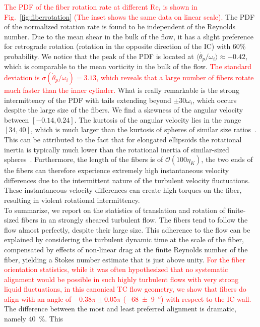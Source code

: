 \documentclass[aps, pre, onecolumn, superscriptaddress,longbibliography]{revtex4-1}
\newcommand{\makered}[1]{\textcolor{red}{#1}}
\begin{document}
%
\makered{The PDF of the fiber rotation rate at different $\text{Re}_i$ is shown in
Fig.~\ref{fig:fiberrotation} (The inset shows the same data on linear scale).}
The PDF of the normalized rotation rate is found
to be independent of the Reynolds number.
Due to the mean shear in the bulk of the flow, it has a slight preference for retrograde rotation (rotation in the opposite
direction of the IC) with 60\% probability. We notice
that the peak of the PDF is located at $\langle
\dot{\theta_p}/\omega_i \rangle \approx -0.42$, which is comparable to the
mean vorticity in the bulk of the flow.
\makered{The standard deviation is $\sigma(\dot{\theta}_p/\omega_i)=3.13$, which reveals that a large number of fibers rotate much faster than the inner cylinder.}
What is really remarkable is the
strong intermittency of the PDF with tails extending beyond $\pm30\omega_i$,
which occurs despite the large size of the fibers. We find a skewness of the
angular velocity between  $[-0.14, 0.24]$. The kurtosis of the angular
velocity lies in the range $[34,40]$, which is much larger than the kurtosis
of spheres of similar size
ratios~\cite{Zimmermann2011,Mathai2016b,Mathai2018b}. This can be attributed
to the fact that for elongated ellipsoids the rotational inertia is typically
much lower than the rotational inertia of similar-sized
spheres~\cite{Zhao2015}. Furthermore, the length of the fibers is of
$\mathcal{O}(100\eta_K)$, the two ends of the fibers can therefore experience extremely high instantaneous velocity differences due to the intermittent nature of the turbulent velocity fluctuations. These instantaneous velocity differences can create high torques on the fiber, resulting in violent rotational intermittency.\\
\indent To summarize, we report on the statistics of translation and
rotation of finite-sized fibers in an strongly sheared turbulent
flow. The fibers tend to follow the flow almost perfectly,
despite their large size. This adherence to the flow can be explained by
considering the turbulent dynamic time at the scale of the fiber, compensated
by effects of non-linear drag at the finite Reynolds number of the fiber,
yielding a Stokes number estimate that is just above unity.
\makered{For the fiber
orientation statistics, while it was often hypothesized that no systematic
alignment would be possible in such highly turbulent flows with very strong liquid fluctuations, in this canonical TC
flow geometry, we show that fibers do align with an angle of $-0.38\pi \pm 0.05\pi$
(\SI[separate-uncertainty =
true,multi-part-units=single]{-68(9)}{\degree}) with respect to the IC wall.} The difference between the most and least preferred alignment is dramatic, namely \SI{40}{\percent}. This
\end{document}
